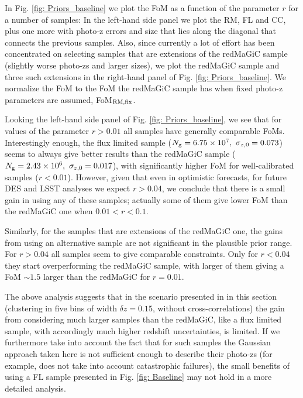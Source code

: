 \documentclass[a4paper,fleqn,usenatbib]{mnras}
\begin{document}
In Fig. \ref{fig: Priors_baseline} we plot the FoM as a function of the parameter $r$ for a number of samples: In the left-hand side panel we plot the RM, FL and CC, plus one more with photo-z errors and size that lies along the diagonal that connects the previous samples. Also, since currently  a lot of effort has been concentrated on selecting samples that are extensions of the redMaGiC sample (slightly worse photo-zs and larger sizes), we plot the redMaGiC sample and three such extensions in the right-hand panel of Fig. \ref{fig: Priors_baseline}. We normalize the FoM to the FoM the redMaGiC sample has when fixed photo-z parameters are assumed, FoM$_{\mbox{\scriptsize{RM,fix}}}$.

Looking the left-hand side panel of Fig. \ref{fig: Priors_baseline},  we see that for values of the parameter $r > 0.01$ all samples have generally comparable FoMs. Interestingly enough, the flux limited sample ($N_{\mbox{\scriptsize{g}}} = 6.75 \times 10^7, \,\, \sigma_{z,0} = 0.073$) seems to always give better results than the redMaGiC sample ($N_{\mbox{\scriptsize{g}}} = 2.43 \times 10^6, \,\, \sigma_{z,0} = 0.017$), with significantly higher FoM for well-calibrated samples ($r<0.01$). However, given that even in optimistic forecasts, for future DES and LSST analyses we expect $r > 0.04$, we conclude that there is a small gain in using any of these samples; actually some of them give lower FoM than the redMaGiC one when $0.01 < r < 0.1$.

Similarly, for the samples that are extensions of the redMaGiC one, the gains from using an alternative sample are not significant in the plausible prior range. For  $r > 0.04$ all samples seem to give comparable constraints. Only for $ r < 0.04$ they start overperforming the redMaGiC sample, with larger of them giving a FoM $\sim 1.5$ larger than the redMaGiC for $r = 0.01$. 

The above analysis suggests that in the scenario presented in in this section (clustering in five bins of width $\delta z = 0.15$, without cross-correlations) the gain from considering much larger samples than the redMaGiC, like a flux limited sample, with accordingly much higher redshift uncertainties, is limited. If we furthermore take into account the fact that for such samples the Gaussian approach taken here is not sufficient enough to describe their photo-zs (for example, does not take into account catastrophic failures), the small benefits of using a FL sample presented in Fig. \ref{fig: Baseline} may not hold in a more detailed analysis. 
\end{document}
